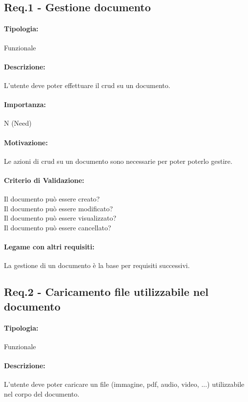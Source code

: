 
\subsection{Req.1 - Gestione documento}
\paragraph{Tipologia:}
	Funzionale
\paragraph{Descrizione:}
	L'utente deve poter effettuare il \gls{crud} su un documento.
\paragraph{Importanza:}
	N (Need)
\paragraph{Motivazione:}
	Le azioni di \gls{crud} su un documento sono necessarie per poter poterlo gestire.
\paragraph{Criterio di Validazione:}
	Il documento può essere creato?\\
	Il documento può essere modificato?\\
	Il documento può essere visualizzato?\\
	Il documento può essere cancellato?
\paragraph{Legame con altri requisiti:}
	La gestione di un documento è la base per requisiti successivi.

\subsection{Req.2 - Caricamento file utilizzabile nel documento}
\paragraph{Tipologia:}
	Funzionale
\paragraph{Descrizione:}
	L'utente deve poter caricare un file (immagine, pdf, audio, video, ...) utilizzabile nel corpo del documento.
